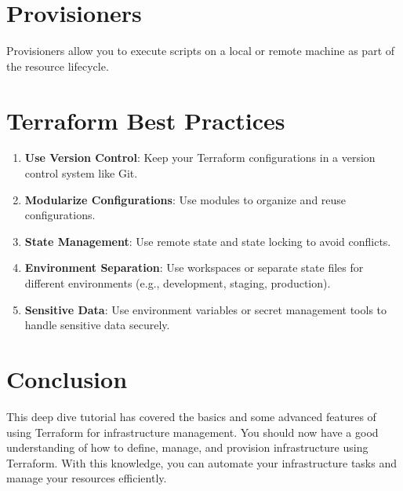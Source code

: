 \documentclass[
  letterpaper,
  DIV=11,
  numbers=noendperiod]{scrreprt}
\newenvironment{Shaded}{\begin{snugshade}}{\end{snugshade}}
\newcommand{\NormalTok}[1]{\textcolor[rgb]{0.00,0.23,0.31}{#1}}
\providecommand{\tightlist}{%
  \setlength{\itemsep}{0pt}\setlength{\parskip}{0pt}}\usepackage{longtable,booktabs,array}
\begin{document}
\section{Provisioners}\label{provisioners}

Provisioners allow you to execute scripts on a local or remote machine
as part of the resource lifecycle.

\begin{Shaded}
\end{Shaded}

\section{Terraform Best Practices}\label{terraform-best-practices}

\begin{enumerate}
\def\labelenumi{\arabic{enumi}.}
\tightlist
\item
  \textbf{Use Version Control}: Keep your Terraform configurations in a
  version control system like Git.
\item
  \textbf{Modularize Configurations}: Use modules to organize and reuse
  configurations.
\item
  \textbf{State Management}: Use remote state and state locking to avoid
  conflicts.
\item
  \textbf{Environment Separation}: Use workspaces or separate state
  files for different environments (e.g., development, staging,
  production).
\item
  \textbf{Sensitive Data}: Use environment variables or secret
  management tools to handle sensitive data securely.
\end{enumerate}

\section{Conclusion}\label{conclusion-41}

This deep dive tutorial has covered the basics and some advanced
features of using Terraform for infrastructure management. You should
now have a good understanding of how to define, manage, and provision
infrastructure using Terraform. With this knowledge, you can automate
your infrastructure tasks and manage your resources efficiently.
\end{document}
